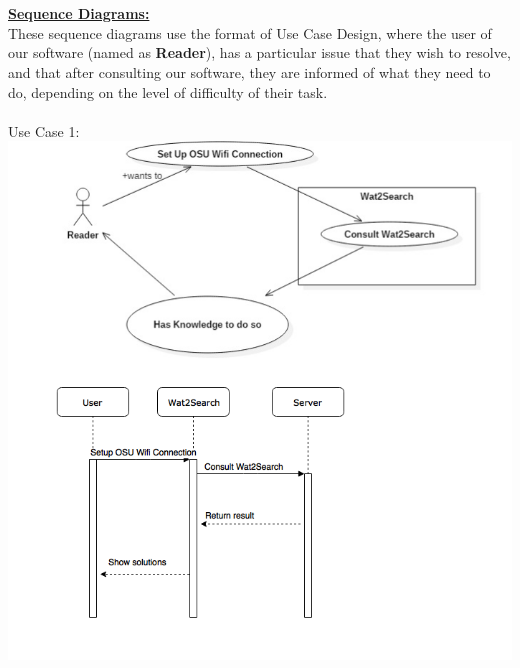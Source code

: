 \documentclass[12pt, letterpaper]{article}
\begin{document}
\\\\\\\\
\\\\\\\\
\\\\\\\\\\
\\\\\\\\\\\\\\\\\\\\\\
\underline{\textbf{Sequence Diagrams:}}
\\These sequence diagrams use the format of Use Case Design, where the user of our software (named as \textbf{Reader}), has a particular issue that they wish to resolve, and that after consulting our software, they are informed of what they need to do, depending on the level of difficulty of their task.
\\\\Use Case 1:
\\\includegraphics[scale=.75]{use_case1.png}
\end{document}
